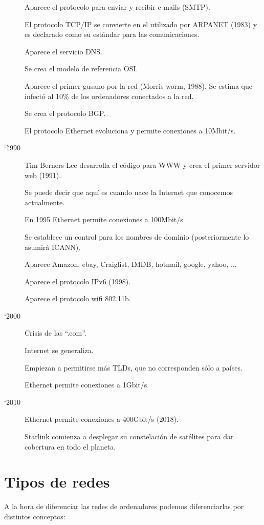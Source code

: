 \begin{description}
    Aparece el protocolo para enviar y recibir e-mails (SMTP).

    El protocolo TCP/IP se convierte en el utilizado por ARPANET (1983) y es declarado como su estándar para las comunicaciones.

    Aparece el servicio DNS.

    Se crea el modelo de referencia OSI.

    Aparece el primer gusano por la red (Morris worm, 1988). Se estima que infectó al 10\% de los ordenadores conectados a la red.

    Se crea el protocolo BGP.

    El protocolo Ethernet evoluciona y permite conexiones a 10Mbit/s.


    \item[\char`\~ 1990]
    Tim Berners-Lee desarrolla el código para WWW y crea el primer servidor web (1991).

    Se puede decir que aquí es cuando nace la Internet que conocemos actualmente.

    En 1995 Ethernet permite conexiones a 100Mbit/s

    Se establece un control para los nombres de dominio (posteriormente lo asumirá ICANN).

    Aparece Amazon, ebay, Craiglist, IMDB, hotmail, google, yahoo, ...

    Aparece el protocolo IPv6 (1998).

    Aparece el protocolo wifi 802.11b.

    \item[\char`\~ 2000]
    Crisis de las “.com”.

    Internet se generaliza.

    Empiezan a permitirse más TLDs, que no corresponden sólo a países.

    Ethernet permite conexiones a 1Gbit/s

    \item[\char`\~ 2010]
    Ethernet permite conexiones a 400Gbit/s (2018).

    Starlink comienza a desplegar su constelación de satélites para dar cobertura en todo el planeta.


\end{description}

\section{Tipos de redes}
A la hora de diferenciar las redes de ordenadores podemos diferenciarlas por distintos conceptos:

